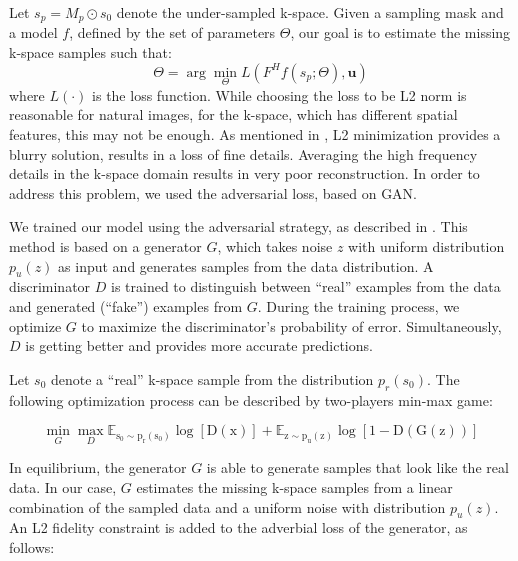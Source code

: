 \documentclass[review]{elsarticle}
\begin{document}
Let $s_{p}=M_{p}\odot s_{0}$ denote the under-sampled k-space. Given a sampling mask and a model $f$, defined by the set of parameters $\Theta$, our goal is to estimate the missing k-space samples such that: 
\begin{equation}
\Theta=\arg\min_{\Theta}L(F^{H}f\left(s_{p};\Theta\right),\boldsymbol{u})
\end{equation}
where $L\left(\cdot\right)$ is the loss function. While choosing the loss to be L2 norm is reasonable for natural images, for the k-space, which has different spatial features, this may not be enough. As mentioned in \cite{pathak2016context}, L2 minimization provides a blurry solution, results in a loss of fine details. 
Averaging the high frequency details in the k-space domain results in very poor reconstruction. In order to address this problem, we used the adversarial loss, based on GAN.

We trained our model using the adversarial strategy, as described in \cite{goodfellow2014generative,radford2015unsupervised}. 
This method is based on a generator $G$, which takes noise \textbf{$z$ }with uniform distribution \textbf{$p_{u}\left(z\right)$} as input and generates samples from the data distribution. A discriminator $D$ is trained to distinguish between ``real'' examples from the data and generated (``fake'') examples from $G.$ During the training process, we optimize $G$ to maximize the discriminator's probability of error. Simultaneously, $D$ is getting better and provides more
accurate predictions.

Let $s_{0}$ denote a ``real'' k-space sample from the distribution $p_{r}\left(s_{0}\right)$. The following optimization process can be described by two-players min-max game:

\begin{equation}
\min_{G}\max_{D}\mathbb{E_{\mathrm{s_{0}\sim p_{r}\left(s_{0}\right)}}\mathrm{\log\left[D\left(x\right)\right]}}+\mathbb{E_{\mathrm{z\sim p_{u}\left(z\right)}}\mathrm{\log\left[1-D\left(G(z)\right)\right]}}
\end{equation}

In equilibrium, the generator $G$ is able to generate samples that look like the real data. In our case, $G$ estimates the missing k-space samples from a linear combination of the sampled data and a uniform noise with distribution $p_{u}\left(z\right)$. An L2 fidelity constraint is added to the adverbial loss of the generator, as follows:
\end{document}
